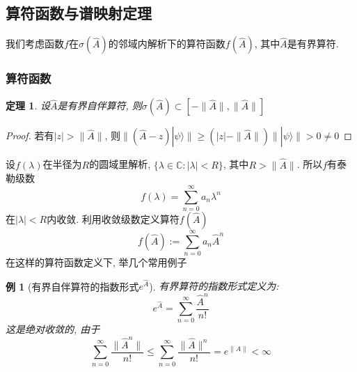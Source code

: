 \documentclass[a4paper,11pt]{book}
\newtheorem{theorem}{\hspace{2em}定理}[section]
\newtheorem{proof}{证明}[section]
\newtheorem{example}{例}[section]
\begin{document}
\subsection{算符函数与谱映射定理}
我们考虑函数$f$在$\sigma(\hat{A})$的邻域内解析下的算符函数$f(\hat{A})$, 其中$\hat{A}$是有界算符.
\subsubsection{算符函数}
\begin{theorem}
  设$\hat{A}$是有界自伴算符, 则$\sigma(\hat{A})\subset[-\|\hat{A}\|,\|\hat{A}\|]$
\end{theorem}
\begin{proof}
  若有$|z|>\|\hat{A}\|$, 则$\|(\hat{A}-z)|\psi\rangle\|\geq(|z|-\|\hat{A}\|)\||\psi\rangle\|>0\neq0$
\end{proof}
设$f(\lambda)$在半径为$R$的圆域里解析, $\{\lambda\in\mathbb{C}:|\lambda|<R\}$, 其中$R>\|\hat{A}\|$. 所以$f$有泰勒级数
\begin{equation*}
  f(\lambda)=\sum_{n=0}^{\infty}a_n\lambda^n
\end{equation*}
在$|\lambda|<R$内收敛. 利用收敛级数定义算符$f(\hat{A})$
\begin{equation}\label{operator function}
  f(\hat{A}):=\sum_{n=0}^{\infty}a_n\hat{A}^n
\end{equation}
在这样的算符函数定义下, 举几个常用例子
\begin{example}[有界自伴算符的指数形式$e^{\hat{A}}$]\label{eA bound}
  有界算符的指数形式定义为:
  \begin{equation*}
    e^{\hat{A}}=\sum_{n=0}^{\infty}\frac{\hat{A}^n}{n!}
  \end{equation*}
  这是绝对收敛的, 由于
  \begin{equation*}
    \sum_{n=0}^{\infty}\frac{\|\hat{A}^n\|}{n!}\leq\sum_{n=0}^{\infty}\frac{\|\hat{A}\|^n}{n!}=e^{\|A\|}<\infty
  \end{equation*}
\end{example}
\end{document}

